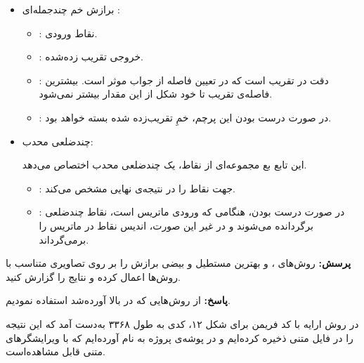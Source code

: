 \documentclass[12pt,a4paper]{article}
\theoremstyle{definition}
\theoremstyle{theorem}
\theoremstyle{definition}
\begin{document}
\begin{itemize}
\renewcommand{\labelitemi}{$\bullet$}
\item
برازش خم چندجمله‌ای :‌


\begin{itemize}
\renewcommand{\labelitemii}{$\circ$}
\item 
{} : 
نقاط ورودی.

\item 
{} : 
خروجی تقریب زده‌شده. 

\item 
{} : 
دقت در تقریب است که در تعیین فاصله از جواب موثر است. بیشترین فاصله‌ی تقریب تا خود شکل از این مقدار بیشتر نمی‌شود.
\item
{} : 
در صورت درست بودن این پرچم، خمِ تقریب‌زده‌ شده بسته خواهد بود.

\end{itemize}

\item
چندضلعی محدب: 


این تابع بع مجموعه‌ای از نقاط، یک چندضلعی محدب اختصاص می‌دهد. 

\begin{itemize}
\renewcommand{\labelitemii}{$\circ$}
\item 

 : 
جهت نقاط را در نتیجه‌ی نهایی  مشخص می‌کند. 

\item
{} : 
در صورت درست بودن، هنگامی که ورودی ماتریس است، نقاط چندضلعی برگردانده می‌شوند و در غیر این صورت، اندیس نقاط در ماتریس را برمی‌گرداند. 

\end{itemize}


\end{itemize}



\textbf{پرسش:}
 روش‌های
، 
و بهترین مستطیل و بیضی برازش را بر روی تصاویری متناسب با روش‌ها اعمال کرده و نتایج را گزارش کنید.

\textbf{پاسخ:}
از روش‌هایی که در بالا آورده‌شد استفاده نمودیم. 

در روش ارایه با کد فریمن برای شکل ۱۲، کدی به طول ۳۳۶۸ به‌دست آمد که این نتیجه را در فایل متنی ذخیره کرده‌ایم و در پوشه‌ی پروژه به نام 
آورده‌ایم که با ویرایشگرهای متنی قابل مشاهده‌است. 
\end{document}
